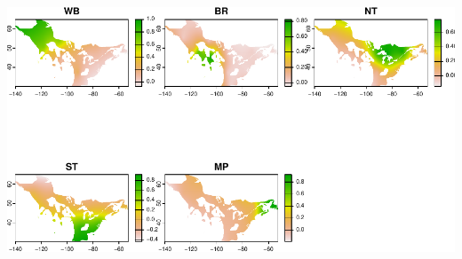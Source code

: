 \documentclass[
]{book}
\begin{document}
\includegraphics[width=0.7\linewidth]{Mignette_files/figure-latex/unnamed-chunk-26-1}

  
\end{document}

